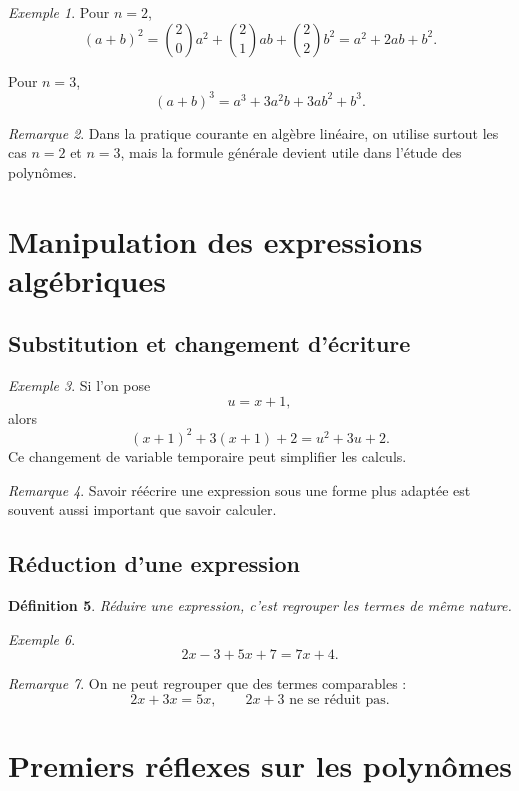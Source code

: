 \documentclass[11pt,a4paper]{article}
\newtheorem{definition}{Définition}[section]
\theoremstyle{remark}
\newtheorem{remarque}[definition]{Remarque}
\newtheorem{exemple}[definition]{Exemple}
\begin{document}
\begin{exemple}
Pour \(n=2\),
\[
(a+b)^2=\binom{2}{0}a^2+\binom{2}{1}ab+\binom{2}{2}b^2=a^2+2ab+b^2.
\]

Pour \(n=3\),
\[
(a+b)^3=a^3+3a^2b+3ab^2+b^3.
\]
\end{exemple}

\begin{remarque}
Dans la pratique courante en algèbre linéaire, on utilise surtout les cas \(n=2\) et \(n=3\), mais la formule générale devient utile dans l’étude des polynômes.
\end{remarque}

\section{Manipulation des expressions algébriques}

\subsection{Substitution et changement d’écriture}

\begin{exemple}
Si l’on pose
\[
u=x+1,
\]
alors
\[
(x+1)^2+3(x+1)+2=u^2+3u+2.
\]
Ce changement de variable temporaire peut simplifier les calculs.
\end{exemple}

\begin{remarque}
Savoir réécrire une expression sous une forme plus adaptée est souvent aussi important que savoir calculer.
\end{remarque}

\subsection{Réduction d’une expression}

\begin{definition}
Réduire une expression, c’est regrouper les termes de même nature.
\end{definition}

\begin{exemple}
\[
2x-3+5x+7=7x+4.
\]
\end{exemple}

\begin{remarque}
On ne peut regrouper que des termes comparables :
\[
2x+3x=5x,
\qquad
2x+3 \text{ ne se réduit pas.}
\]
\end{remarque}

\section{Premiers réflexes sur les polynômes}
\end{document}
